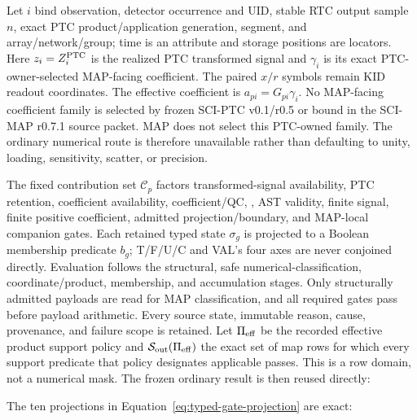 \documentclass[10pt]{article}
\begin{document}
Let \(i\) bind observation, detector occurrence and UID, stable RTC output
sample \(n\), exact PTC product/application generation, segment, and
array/network/group; time is an attribute and storage positions are locators.
Here \(z_i=Z_i^{\rm PTC}\) is the realized PTC transformed signal and
\(\gamma_i\) is its exact PTC-owner-selected MAP-facing coefficient. The
paired \(x/r\) symbols remain KID readout coordinates. The effective
coefficient is \(a_{pi}=G_{pi}\gamma_i\). No MAP-facing coefficient family is
selected by frozen SCI-PTC v0.1/r0.5 or bound in the SCI-MAP r0.7.1 source
packet. MAP does not select this PTC-owned family. The ordinary numerical
route is therefore unavailable rather than defaulting to unity, loading,
sensitivity, scatter, or precision.

The fixed contribution set \(\mathcal C_p\) factors transformed-signal
availability, PTC retention, coefficient availability, coefficient/QC,
\SCIMapUpstreamProfile, AST validity, finite signal, finite
positive coefficient, admitted projection/boundary, and MAP-local companion
gates. Each retained typed state \(\sigma_g\) is projected to a Boolean
membership predicate \(b_g\); T/F/U/C and VAL's four axes are never conjoined
directly. Evaluation follows the structural, safe numerical-classification,
coordinate/product, membership, and accumulation stages. Only structurally
admitted payloads are read for MAP classification, and all required gates
pass before payload arithmetic. Every source state, immutable reason, cause,
provenance, and failure scope is retained.
Let \(\Pi_{\rm eff}\) be the recorded effective product
support policy and \(\mathcal S_{\rm out}(\Pi_{\rm eff})\) the exact set of map
rows for which every support predicate that policy designates applicable
passes. This is a row domain, not a numerical mask. The frozen ordinary result
is then reused directly:

\SCIMapObservationEquations

The ten projections in Equation~\eqref{eq:typed-gate-projection} are exact:
\end{document}
